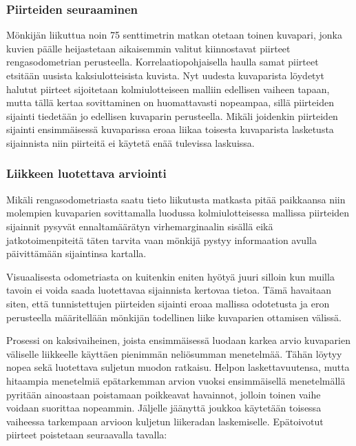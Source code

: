 \documentclass[finnish]{tktltiki2}
\theoremstyle{definition}
\theoremstyle{remark}
\begin{document}
\subsubsection{Piirteiden seuraaminen}
Mönkijän liikuttua noin 75 senttimetrin matkan otetaan toinen kuvapari, jonka kuvien päälle heijastetaan aikaisemmin valitut kiinnostavat piirteet rengasodometrian perusteella. Korrelaatiopohjaisella haulla samat piirteet etsitään uusista kaksiulotteisista kuvista. Nyt uudesta kuvaparista löydetyt halutut piirteet sijoitetaan kolmiulotteiseen malliin edellisen vaiheen tapaan, mutta tällä kertaa sovittaminen on huomattavasti nopeampaa, sillä piirteiden sijainti tiedetään jo edellisen kuvaparin perusteella. Mikäli joidenkin piirteiden sijainti ensimmäisessä kuvaparissa eroaa liikaa toisesta kuvaparista lasketusta sijainnista niin piirteitä ei käytetä enää tulevissa laskuissa.

\subsubsection{Liikkeen luotettava arviointi}
Mikäli rengasodometriasta saatu tieto liikutusta matkasta pitää paikkaansa niin molempien kuvaparien sovittamalla luodussa kolmiulotteisessa mallissa piirteiden sijainnit pysyvät ennaltamäärätyn virhemarginaalin sisällä eikä jatkotoimenpiteitä täten tarvita vaan mönkijä pystyy informaation avulla päivittämään sijaintinsa kartalla. 

Visuaalisesta odometriasta on kuitenkin eniten hyötyä juuri silloin kun muilla tavoin ei voida saada luotettavaa sijainnista kertovaa tietoa. Tämä havaitaan siten, että tunnistettujen piirteiden sijainti eroaa mallissa odotetusta ja eron perusteella määritellään mönkijän todellinen liike kuvaparien ottamisen välissä.

Prosessi on kaksivaiheinen, joista ensimmäisessä luodaan karkea arvio kuvaparien väliselle liikkeelle käyttäen pienimmän neliösumman menetelmää. Tähän löytyy nopea sekä luotettava suljetun muodon ratkaisu. Helpon laskettavuutensa, mutta hitaampia menetelmiä epätarkemman arvion vuoksi ensimmäisellä menetelmällä pyritään ainoastaan poistamaan poikkeavat havainnot, jolloin toinen vaihe voidaan suorittaa nopeammin. Jäljelle jäänyttä joukkoa käytetään toisessa vaiheessa tarkempaan arvioon kuljetun liikeradan laskemiselle. Epätoivotut piirteet poistetaan seuraavalla tavalla:
\end{document}
